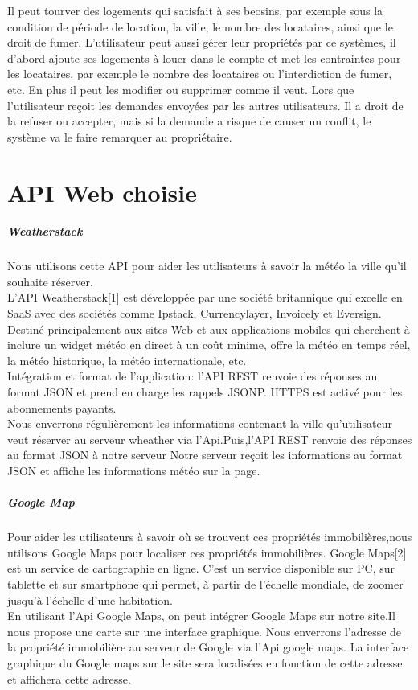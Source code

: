\documentclass[14px]{article}
\begin{document}
Il peut tourver des logements qui satisfait à ses beosins, par exemple sous la condition de période de location, la ville, le nombre des locataires, ainsi que le droit de fumer.
L'utilisateur peut aussi gérer leur propriétés par ce systèmes, il d'abord ajoute ses logements à louer dans le compte et met les contraintes pour les locataires, par exemple le nombre des locataires ou l'interdiction de fumer, etc.  En plus il peut les modifier ou supprimer comme il veut. Lors que l'utilisateur reçoit les demandes envoyées par les autres utilisateurs. Il a droit de la refuser ou accepter, mais si la demande a risque de causer un conflit, le système va le faire remarquer au propriétaire.

\section{API Web choisie}
\subparagraph{Weatherstack}
Nous utilisons cette API pour aider les utilisateurs à savoir la météo la ville qu'il souhaite réserver.\\
L'API Weatherstack[1] est développée par une société britannique qui excelle en SaaS avec des sociétés comme Ipstack, Currencylayer, Invoicely et Eversign. Destiné principalement aux sites Web et aux applications mobiles qui cherchent à inclure un widget météo en direct à un coût minime, offre la météo en temps réel, la météo historique, la météo internationale, etc.\\
Intégration et format de l'application: l'API REST renvoie des réponses au format JSON et prend en charge les rappels JSONP. HTTPS est activé pour les abonnements payants.\\
Nous enverrons régulièrement les informations contenant la ville qu'utilisateur veut réserver au serveur wheather via l'Api.Puis,l'API REST renvoie des réponses au format JSON à notre serveur Notre serveur reçoit les informations au format JSON et affiche les informations météo sur la page.
\subparagraph{Google Map}
Pour aider les utilisateurs à savoir où se trouvent ces propriétés immobilières,nous utilisons Google Maps pour localiser ces propriétés immobilières.
Google Maps[2] est un service de cartographie en ligne. C'est un service disponible sur PC, sur tablette et sur smartphone qui permet, à partir de l'échelle mondiale, de zoomer jusqu'à l'échelle d'une habitation.\\
En utilisant l'Api Google Maps, on peut intégrer Google Maps sur notre site.Il nous propose une carte sur une interface graphique. Nous enverrons l'adresse de la propriété immobilière au serveur de Google via l'Api google maps. La interface graphique du Google maps sur le site sera localisées en fonction de cette adresse et affichera cette adresse.
\end{document}

